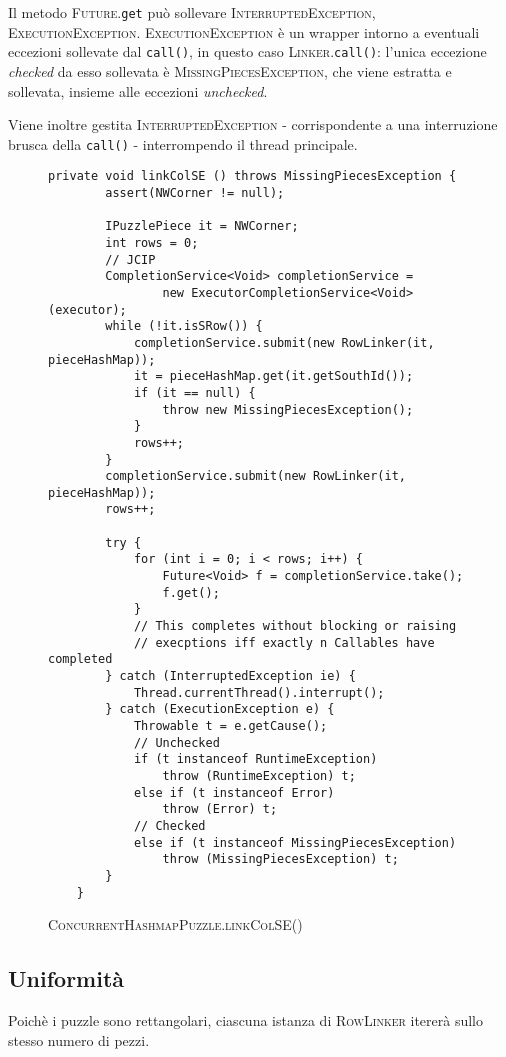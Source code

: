 \documentclass[a4paper]{article}
\newcommand{\Classname}[1]{\textsc{#1}}
\newcommand{\Methodname}[1]{\texttt{#1}}
\begin{document}
Il metodo \Classname{Future}.\Methodname{get} pu\`o sollevare \Classname{InterruptedException}, \Classname{ExecutionException}.
\Classname{ExecutionException} \`e un wrapper intorno a eventuali eccezioni sollevate dal \Methodname{call()}, in questo caso \Classname{Linker}.\Methodname{call()}: l'unica eccezione \emph{checked} da esso sollevata \`e \Classname{MissingPiecesException}, che viene estratta e sollevata, insieme alle eccezioni \emph{unchecked}.

Viene inoltre gestita \Classname{InterruptedException} - corrispondente a una interruzione brusca della \Methodname{call()} - interrompendo il thread principale.

\begin{figure}[h!]
  \centering
\label{linkcol}
\begin{lstlisting}[frame=single]
	private void linkColSE () throws MissingPiecesException {
		assert(NWCorner != null);
		
		IPuzzlePiece it = NWCorner;
		int rows = 0;
		// JCIP
		CompletionService<Void> completionService = 
                new ExecutorCompletionService<Void>(executor);
		while (!it.isSRow()) {
			completionService.submit(new RowLinker(it, pieceHashMap));
			it = pieceHashMap.get(it.getSouthId());
			if (it == null) {
				throw new MissingPiecesException();
			}
			rows++;
		}
		completionService.submit(new RowLinker(it, pieceHashMap));
		rows++;

		try {
			for (int i = 0; i < rows; i++) {
				Future<Void> f = completionService.take();
				f.get();
			}
			// This completes without blocking or raising
			// execptions iff exactly n Callables have completed
		} catch (InterruptedException ie) {
			Thread.currentThread().interrupt();
		} catch (ExecutionException e) {
			Throwable t = e.getCause();
			// Unchecked
			if (t instanceof RuntimeException) 
				throw (RuntimeException) t;
			else if (t instanceof Error)
				throw (Error) t;
			// Checked
			else if (t instanceof MissingPiecesException)
				throw (MissingPiecesException) t;
		}
	}
\end{lstlisting}
\caption {\textsc{ConcurrentHashmapPuzzle.linkColSE()}}
\end{figure}


\subsection{Uniformit\`a}
Poich\`e i puzzle sono rettangolari, ciascuna istanza di \Classname{RowLinker} iterer\`a sullo stesso numero di pezzi.
\end{document}
